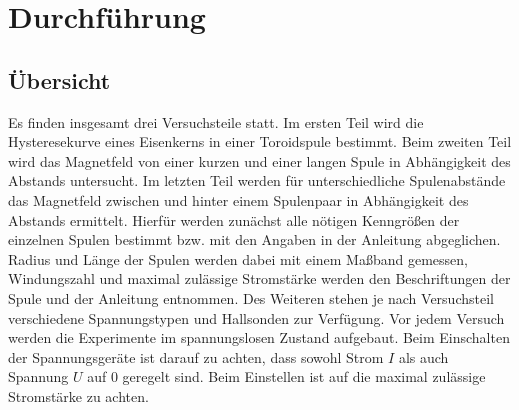 \section{Durchführung}
\subsection{Übersicht}
Es finden insgesamt drei Versuchsteile statt. 
Im ersten Teil wird die Hysteresekurve eines Eisenkerns in einer Toroidspule bestimmt.
Beim zweiten Teil wird das Magnetfeld von einer kurzen und einer langen Spule in Abhängigkeit des Abstands untersucht.
Im letzten Teil werden für unterschiedliche Spulenabstände das Magnetfeld zwischen und hinter einem Spulenpaar in Abhängigkeit des Abstands ermittelt.
Hierfür werden zunächst alle nötigen Kenngrößen der einzelnen Spulen bestimmt bzw. mit den Angaben in der Anleitung \cite[]{man:v308} abgeglichen.
Radius und Länge der Spulen werden dabei mit einem Maßband gemessen,
Windungszahl und maximal zulässige Stromstärke werden den Beschriftungen der Spule und der Anleitung entnommen.
Des Weiteren stehen je nach Versuchsteil verschiedene Spannungstypen und Hallsonden zur Verfügung.
Vor jedem Versuch werden die Experimente im spannungslosen Zustand aufgebaut.
Beim Einschalten der Spannungsgeräte ist darauf zu achten, dass sowohl Strom $I$ als auch Spannung $U$ auf 0 geregelt sind.
Beim Einstellen ist auf die maximal zulässige Stromstärke zu achten.









